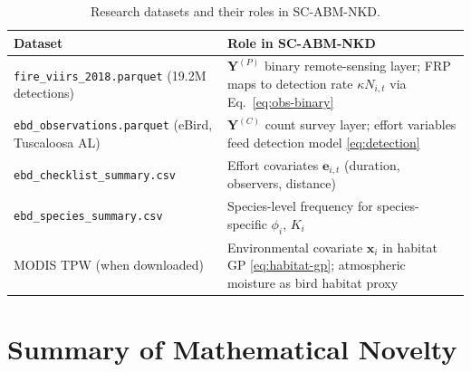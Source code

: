 \documentclass[12pt,a4paper]{article}
\theoremstyle{definition}
\newcommand{\bx}{\bm{x}}
\begin{document}
\begin{table}[h!]
\centering
\small
\renewcommand{\arraystretch}{1.35}
\begin{tabular}{p{5.4cm}p{8.2cm}}
\toprule
\textbf{Dataset} & \textbf{Role in SC-ABM-NKD} \\
\midrule
\texttt{fire\_viirs\_2018.parquet} (19.2M detections) &
  $\mathbf{Y}^{(P)}$ binary remote-sensing layer; FRP maps to detection
  rate $\kappa N_{i,t}$ via Eq.~\eqref{eq:obs-binary} \\[4pt]
\texttt{ebd\_observations.parquet} (eBird, Tuscaloosa AL) &
  $\mathbf{Y}^{(C)}$ count survey layer; effort variables feed detection
  model \eqref{eq:detection} \\[4pt]
\texttt{ebd\_checklist\_summary.csv} &
  Effort covariates $\bm{e}_{i,t}$ (duration, observers, distance) \\[4pt]
\texttt{ebd\_species\_summary.csv} &
  Species-level frequency for species-specific $\phi_i$, $K_i$ \\[4pt]
MODIS TPW (when downloaded) &
  Environmental covariate $\bx_i$ in habitat GP \eqref{eq:habitat-gp};
  atmospheric moisture as bird habitat proxy \\
\bottomrule
\end{tabular}
\caption{Research datasets and their roles in SC-ABM-NKD.}
\label{tab:data}
\end{table}

\section{Summary of Mathematical Novelty}
\label{sec:summary}
\end{document}
